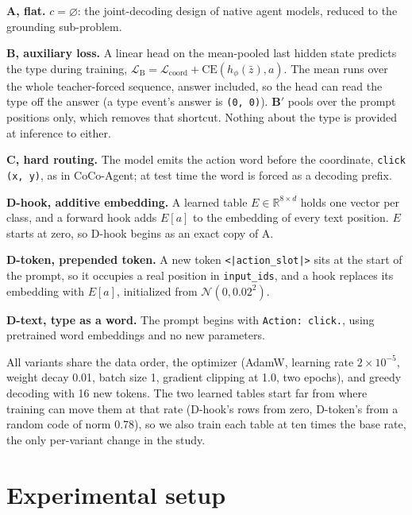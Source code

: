 \documentclass[letterpaper]{article} %
\begin{document}
\textbf{A, flat.} $c=\varnothing$: the joint-decoding design of native agent models, reduced to the grounding sub-problem.

\textbf{B, auxiliary loss.} A linear head on the mean-pooled last hidden state predicts the type during training, $\mathcal{L}_{\mathrm{B}} = \mathcal{L}_{\mathrm{coord}} + \mathrm{CE}(h_\phi(\bar z), a)$. The mean runs over the whole teacher-forced sequence, answer included, so the head can read the type off the answer (a type event's answer is \texttt{(0, 0)}). \textbf{B$'$} pools over the prompt positions only, which removes that shortcut. Nothing about the type is provided at inference to either.

\textbf{C, hard routing.} The model emits the action word before the coordinate, \texttt{click (x, y)}, as in CoCo-Agent; at test time the word is forced as a decoding prefix.

\textbf{D-hook, additive embedding.} A learned table $E \in \mathbb{R}^{8\times d}$ holds one vector per class, and a forward hook adds $E[a]$ to the embedding of every text position. $E$ starts at zero, so D-hook begins as an exact copy of A.

\textbf{D-token, prepended token.} A new token \texttt{<|action\_slot|>} sits at the start of the prompt, so it occupies a real position in \texttt{input\_ids}, and a hook replaces its embedding with $E[a]$, initialized from $\mathcal{N}(0, 0.02^2)$.

\textbf{D-text, type as a word.} The prompt begins with \texttt{Action: click.}, using pretrained word embeddings and no new parameters.

All variants share the data order, the optimizer (AdamW, learning rate $2\times10^{-5}$, weight decay 0.01, batch size 1, gradient clipping at 1.0, two epochs), and greedy decoding with 16 new tokens. The two learned tables start far from where training can move them at that rate (D-hook's rows from zero, D-token's from a random code of norm 0.78), so we also train each table at ten times the base rate, the only per-variant change in the study.

\section{Experimental setup}
\label{sec:setup}


\end{document}
